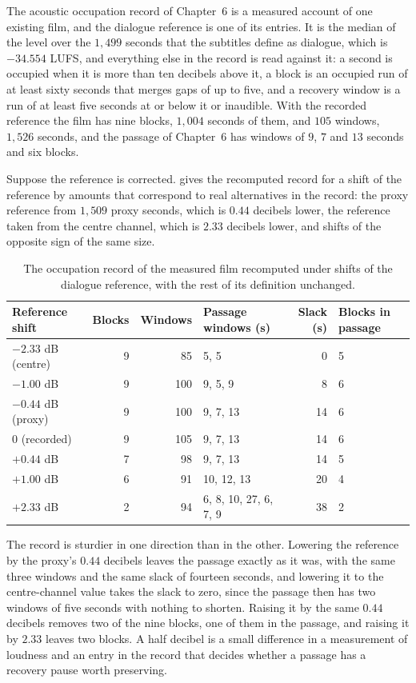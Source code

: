 \documentclass[11pt,twoside,openright]{book}
\theoremstyle{plain}
\theoremstyle{definition}
\theoremstyle{remark}
\begin{document}
The acoustic occupation record of Chapter~6 is a measured account of one existing film, and the dialogue reference is one of its entries. It is the median of the level over the $1{,}499$ seconds that the subtitles define as dialogue, which is $-34.554$ LUFS, and everything else in the record is read against it: a second is occupied when it is more than ten decibels above it, a block is an occupied run of at least sixty seconds that merges gaps of up to five, and a recovery window is a run of at least five seconds at or below it or inaudible. With the recorded reference the film has nine blocks, $1{,}004$ seconds of them, and $105$ windows, $1{,}526$ seconds, and the passage of Chapter~6 has windows of $9$, $7$ and $13$ seconds and six blocks.

Suppose the reference is corrected.  gives the recomputed record for a shift of the reference by amounts that correspond to real alternatives in the record: the proxy reference from $1{,}509$ proxy seconds, which is $0.44$ decibels lower, the reference taken from the centre channel, which is $2.33$ decibels lower, and shifts of the opposite sign of the same size.

\begin{table}[ht]
\centering
\begin{tabular}{@{}lrrp{2.5cm}rp{1.4cm}@{}}
\toprule
Reference shift & Blocks & Windows & Passage windows (s) & Slack (s) & Blocks in passage\\
\midrule
$-2.33$ dB (centre) & 9 & 85 & 5, 5 & 0 & 5\\
$-1.00$ dB & 9 & 100 & 9, 5, 9 & 8 & 6\\
$-0.44$ dB (proxy) & 9 & 100 & 9, 7, 13 & 14 & 6\\
$0$ (recorded) & 9 & 105 & 9, 7, 13 & 14 & 6\\
$+0.44$ dB & 7 & 98 & 9, 7, 13 & 14 & 5\\
$+1.00$ dB & 6 & 91 & 10, 12, 13 & 20 & 4\\
$+2.33$ dB & 2 & 94 & 6, 8, 10, 27, 6, 7, 9 & 38 & 2\\
\bottomrule
\end{tabular}
\caption{The occupation record of the measured film recomputed under shifts of the dialogue reference, with the rest of its definition unchanged.}\label{tab:ref17}
\end{table}

The record is sturdier in one direction than in the other. Lowering the reference by the proxy's $0.44$ decibels leaves the passage exactly as it was, with the same three windows and the same slack of fourteen seconds, and lowering it to the centre-channel value takes the slack to zero, since the passage then has two windows of five seconds with nothing to shorten. Raising it by the same $0.44$ decibels removes two of the nine blocks, one of them in the passage, and raising it by $2.33$ leaves two blocks. A half decibel is a small difference in a measurement of loudness and an entry in the record that decides whether a passage has a recovery pause worth preserving.
\end{document}
